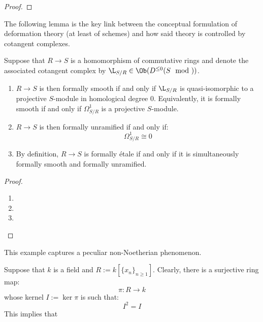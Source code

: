         \begin{lemma}
            
        \end{lemma}
            \begin{proof}
                
            \end{proof}
        The following lemma is the key link between the conceptual formulation of deformation theory (at least of schemes) and how said theory is controlled by cotangent complexes.
        \begin{lemma} \label{lemma: formally_smooth_unramified_and_etale_morphisms_via_cotangent_complexes}
            Suppose that $R \to S$ is a homomorphism of commutative rings and denote the associated cotangent complex by $\L_{S/R} \in \Ob( D^{\leq 0}(S\mod) )$. 
            \begin{enumerate}
                \item $R \to S$ is then formally smooth if and only if $\L_{S/R}$ is quasi-isomorphic to a projective $S$-module in homological degree $0$. Equivalently, it is formally smooth if and only if $\Omega^1_{S/R}$ is a projective $S$-module.
                \item $R \to S$ is then formally unramified if and only if:
                    $$\Omega^1_{S/R} \cong 0$$
                \item By definition, $R \to S$ is formally \'etale if and only if it is simultaneously formally smooth and formally unramified. 
            \end{enumerate}
        \end{lemma}
            \begin{proof}
                \begin{enumerate}
                    \item 
                    \item 
                    \item 
                \end{enumerate}
            \end{proof}
        \begin{example}
            
        \end{example}
        \begin{example}
            This example captures a peculiar non-Noetherian phenomenon.

            Suppose that $k$ is a field and $R := k[\{x_n\}_{n \geq 1}]$. Clearly, there is a surjective ring map:
                $$\pi: R \to k$$
            whose kernel $I := \ker \pi$ is such that:
                $$I^2 = I$$
            This implies that
        \end{example}

